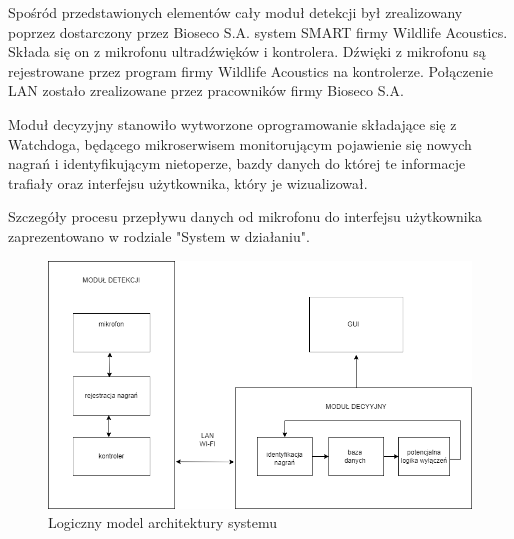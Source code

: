 \documentclass{sprz}
\begin{document}
Spośród przedstawionych elementów cały moduł detekcji był zrealizowany poprzez dostarczony przez Bioseco S.A. system SMART firmy Wildlife Acoustics. Składa się on z mikrofonu ultradźwięków i kontrolera. Dźwięki z mikrofonu są rejestrowane przez program firmy Wildlife Acoustics na kontrolerze. Połączenie LAN zostało zrealizowane przez pracowników firmy Bioseco S.A.

Moduł decyzyjny stanowiło wytworzone oprogramowanie składające się z Watchdoga, będącego mikroserwisem monitorującym pojawienie się nowych nagrań i identyfikującym nietoperze, bazdy danych do której te informacje trafiały oraz interfejsu użytkownika, który je wizualizował.

Szczegóły procesu przepływu danych od mikrofonu do interfejsu użytkownika zaprezentowano w rodziale "System w działaniu".

\begin{figure}[h]
    \centering
    \includegraphics[width=1.0\textwidth]{sprz/architektura_systemu2.png}
    \caption{Logiczny model architektury systemu}
    \label{img:architektura_systemu2}
\end{figure}
\clearpage
\end{document}
